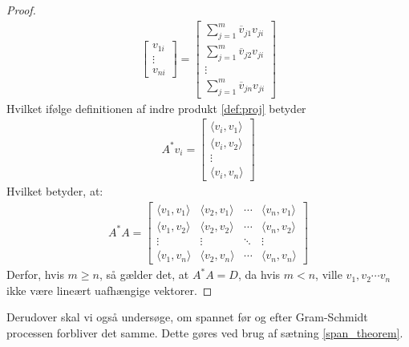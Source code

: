 \begin{theorem}
\begin{proof}
\begin{gather}
\begin{bmatrix}
            v_{1i} \\ \vdots \\ v_{ni}
        \end{bmatrix}
        =
        \begin{bmatrix}
            \sum_{j=1}^{m} \overline{v}_{j1}v_{ji} \\
            \sum_{j=1}^{m} \overline{v}_{j2}v_{ji} \\
            \vdots \\
            \sum_{j=1}^{m} \overline{v}_{jn}v_{ji}
        \end{bmatrix}
    \end{gather}
    Hvilket ifølge definitionen af indre produkt \ref{def:proj} betyder 
    \begin{gather}
        A^* v_i = 
        \begin{bmatrix}
            \langle v_i, v_1 \rangle \\
            \langle v_i, v_2 \rangle \\
            \vdots \\
            \langle v_i, v_n \rangle
        \end{bmatrix}
    \end{gather}
    Hvilket betyder, at:
    \begin{gather}
        A^*A = 
        \begin{bmatrix}
            \langle v_1, v_1 \rangle & \langle v_2, v_1 \rangle & \cdots & \langle v_n, v_1 \rangle \\
            \langle v_1, v_2 \rangle & \langle v_2, v_2 \rangle & \cdots & \langle v_n, v_2 \rangle \\
            \vdots & \vdots & \ddots & \vdots \\
            \langle v_1, v_n \rangle & \langle v_2, v_n \rangle & \cdots & \langle v_n, v_n \rangle
        \end{bmatrix}
    \end{gather}
    Derfor, hvis \( m \geq n \), så gælder det, at \( A^*A = D \), da hvis \( m < n \), ville $v_1, v_2 \cdots v_n$ ikke være lineært uafhængige vektorer.
\end{proof}
\end{theorem}

Derudover skal vi også undersøge, om spannet før og efter Gram-Schmidt processen forbliver det samme. Dette gøres ved brug af sætning \ref{span_theorem}.

